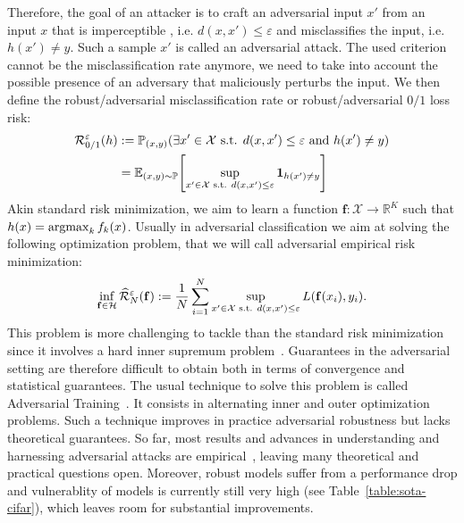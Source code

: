 Therefore, the goal of an attacker is to craft an adversarial input $x'$ from an input $x$ that is imperceptible , i.e. $d(x,x')\leq \varepsilon$ and misclassifies the input, i.e. $h(x')\neq y$. Such a sample $x'$ is called an adversarial attack. The used criterion cannot be the misclassification rate anymore, we need to take into account the possible presence of an adversary that maliciously perturbs the input. We then define the robust/adversarial misclassification rate or robust/adversarial $0/1$ loss risk: 
\begin{align*}
\risk_{0/1}^{\varepsilon}(h)&:=\PP_{(x,y)}(\exists x'\in\XX\text{ s.t. } d(x,x')\leq \varepsilon \text{ and } h(x')\neq y)\\
&= \EE_{(x,y)\sim\PP}\left[\sup_{x'\in\XX\text{ s.t. } d(x,x')\leq \varepsilon}\mathbf{1}_{h(x')\neq y}\right]
\end{align*}
Akin standard risk minimization, we aim to learn a function $\mathbf{f}:\mathcal{X}\to\mathbb{R}^K$ such that $h(x)=\operatorname*{argmax}_k f_k(x)$. Usually in adversarial classification we aim at solving the following optimization problem, that we will call adversarial empirical risk minimization:
\begin{align*}
\inf_{\mathbf{f}\in\mathcal{H}}\widehat{\mathcal{R}}^\varepsilon_{N}(\mathbf{f}):= \frac{1}{N}\sum_{i=1}^N\sup_{x'\in\mathcal{X}\text{ s.t. } d(x,x')\leq \varepsilon} L(\mathbf{f}(x_i),y_i).
\end{align*}
This problem is more challenging to tackle than the standard risk minimization  since it involves a hard inner supremum problem~\citep{madry2017towards}. Guarantees in the adversarial setting are therefore difficult to obtain both in terms of convergence and statistical guarantees. The usual technique to solve this problem is called Adversarial Training~\citep{goodfellow2014explaining,madry2017towards}. It consists in alternating inner and outer optimization problems. Such a technique improves in practice adversarial robustness but lacks theoretical guarantees. So far, most results and advances in understanding and harnessing adversarial attacks are empirical~\citep{ilyas2019adversarial,rice2020overfitting}, leaving many theoretical and practical questions open.  Moreover, robust models suffer from a performance drop and vulnerablity of models is currently still very high (see Table~\ref{table:sota-cifar}), which leaves room for substantial improvements.

